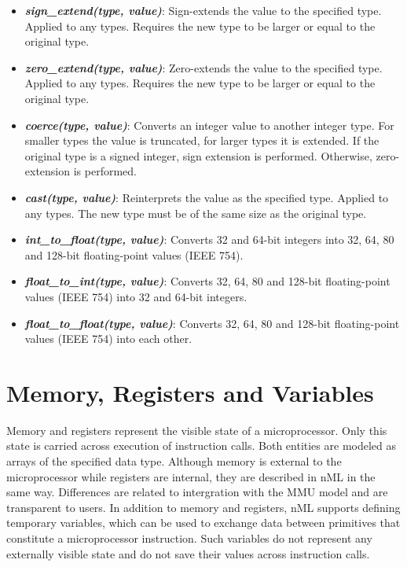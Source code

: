 \begin{itemize}
\item \textbf{\textit{sign{\_}extend(type, value)}}:
Sign-extends the value to the specified type. Applied to any types. Requires
the new type to be larger or equal to the original type.

\item \textbf{\textit{zero{\_}extend(type, value)}}:
Zero-extends the value to the specified type. Applied to any types. Requires
the new type to be larger or equal to the original type.

\item \textbf{\textit{coerce(type, value)}}:
Converts an integer value to another integer type. For smaller types the value
is truncated, for larger types it is extended. If the original type is a signed
integer, sign extension is performed. Otherwise, zero-extension is performed.

\item \textbf{\textit{cast(type, value)}}:
Reinterprets the value as the specified type. Applied to any types. The new type
must be of the same size as the original type.

\item \textbf{\textit{int{\_}to{\_}float(type, value)}}:
Converts 32 and 64-bit integers into 32, 64, 80 and 128-bit floating-point
values (IEEE 754).

\item \textbf{\textit{float{\_}to{\_}int(type, value)}}:
Converts 32, 64, 80 and 128-bit floating-point values (IEEE 754) into 32 and
64-bit integers.

\item \textbf{\textit{float{\_}to{\_}float(type, value)}}:
Converts 32, 64, 80 and 128-bit floating-point values (IEEE 754) into each
other.

\end{itemize}


\section{Memory, Registers and Variables}

Memory and registers represent the visible state of a microprocessor. Only this state is carried
across execution of instruction calls. Both entities are modeled as arrays of the specified
data type. Although memory is external to the microprocessor while registers are internal, they
are described in nML in the same way. Differences are related to intergration with the MMU model
and are transparent to users.
In addition to memory and registers, nML supports defining temporary variables, which can be used
to exchange data between primitives that constitute a microprocessor instruction. Such variables
do not represent any externally visible state and do not save their values across instruction
calls.

